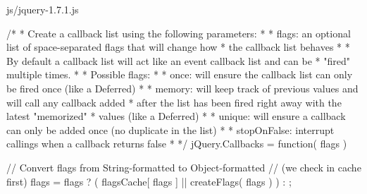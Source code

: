 \documentclass{article}
\begin{document}
\begin{chunk}{js/jquery-1.7.1.js}
{/*
 * Create a callback list using the following parameters:
 *
 *	flags:	an optional list of space-separated flags that will change how
 *			the callback list behaves
 *
 * By default a callback list will act like an event callback list and can be
 * "fired" multiple times.
 *
 * Possible flags:
 *
 *	once:			will ensure the callback list can only be fired once (like a Deferred)
 *
 *	memory:			will keep track of previous values and will call any callback added
 *					after the list has been fired right away with the latest "memorized"
 *					values (like a Deferred)
 *
 *	unique:			will ensure a callback can only be added once (no duplicate in the list)
 *
 *	stopOnFalse:	interrupt callings when a callback returns false
 *
 */
jQuery.Callbacks = function( flags ) {

	// Convert flags from String-formatted to Object-formatted
	// (we check in cache first)
	flags = flags ? ( flagsCache[ flags ] || createFlags( flags ) ) : {};

}}
\end{chunk}
\end{document}

